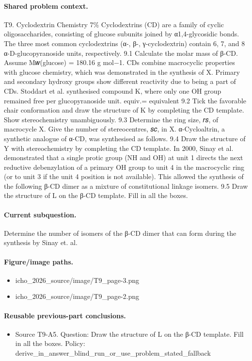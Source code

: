 \paragraph{Shared problem context.}
T9. Cyclodextrin Chemistry 7\% Cyclodextrins (CD) are a family of cyclic oligosaccharides, consisting of glucose subunits joined by α1,4-glycosidic bonds. The three most common cyclodextrins (α-, β-, γ-cyclodextrin) contain 6, 7, and 8 α-D-glucopyranoside units, respectively. 9.1 Calculate the molar mass of β-CD. Assume M𝑤(glucose) = 180.16 g mol−1. CDs combine macrocyclic properties with glucose chemistry, which was demonstrated in the synthesis of X. Primary and secondary hydroxy groups show different reactivity due to being a part of CDs. Stoddart et al. synthesised compound K, where only one OH group remained free per glucopyranoside unit. equiv.= equivalent 9.2 Tick the favorable chair conformation and draw the structure of K by completing the CD template. Show stereochemistry unambiguously. 9.3 Determine the ring size, 𝑟𝑠, of macrocycle X. Give the number of stereocentres, 𝑠𝑐, in X. α-Cycloaltrin, a synthetic analogue of α-CD, was synthesised as follows. 9.4 Draw the structure of Y with stereochemistry by completing the CD template. In 2000, Sinay et al. demonstrated that a single protic group (NH and OH) at unit 1 directs the next reductive debenzylation of a primary OH group to unit 4 in the macrocyclic ring (or to unit 3 if the unit 4 position is not available). This allowed the synthesis of the following β-CD dimer as a mixture of constitutional linkage isomers. 9.5 Draw the structure of L on the β-CD template. Fill in all the boxes.

\paragraph{Current subquestion.}
Determine the number of isomers of the β-CD dimer that can form during the synthesis by Sinay et. al.

\paragraph{Figure/image paths.}
\begin{itemize}
\item icho\_2026\_source/image/T9\_page-3.png
\item icho\_2026\_source/image/T9\_page-2.png
\end{itemize}

\paragraph{Reusable previous-part conclusions.}
\begin{itemize}
\item Source T9-A5. Question: Draw the structure of L on the β-CD template. Fill in all the boxes. Policy: derive\_in\_answer\_blind\_run\_or\_use\_problem\_stated\_fallback
\end{itemize}

